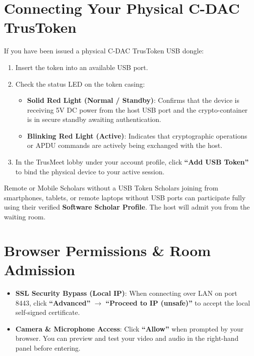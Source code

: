\documentclass[11pt,a4paper]{report}
\begin{document}
\section{Connecting Your Physical C-DAC TrusToken}
If you have been issued a physical C-DAC TrusToken USB dongle:
\begin{enumerate}
    \item Insert the token into an available USB port.
    \item Check the status LED on the token casing:
    \begin{itemize}
        \item \textbf{Solid Red Light (Normal / Standby)}: Confirms that the device is receiving 5V DC power from the host USB port and the crypto-container is in secure standby awaiting authentication.
        \item \textbf{Blinking Red Light (Active)}: Indicates that cryptographic operations or APDU commands are actively being exchanged with the host.
    \end{itemize}
    \item In the TrusMeet lobby under your account profile, click \textbf{``Add USB Token''} to bind the physical device to your active session.
\end{enumerate}

\begin{tipbox}{Remote or Mobile Scholars without a USB Token}
Scholars joining from smartphones, tablets, or remote laptops without USB ports can participate fully using their verified \textbf{Software Scholar Profile}. The host will admit you from the waiting room.
\end{tipbox}

\section{Browser Permissions \& Room Admission}
\begin{itemize}
    \item \textbf{SSL Security Bypass (Local IP)}: When connecting over LAN on port 8443, click \textbf{``Advanced''} $\rightarrow$ \textbf{``Proceed to IP (unsafe)''} to accept the local self-signed certificate.
    \item \textbf{Camera \& Microphone Access}: Click \textbf{``Allow''} when prompted by your browser. You can preview and test your video and audio in the right-hand panel before entering.
\end{itemize}

\newpage
\end{document}
